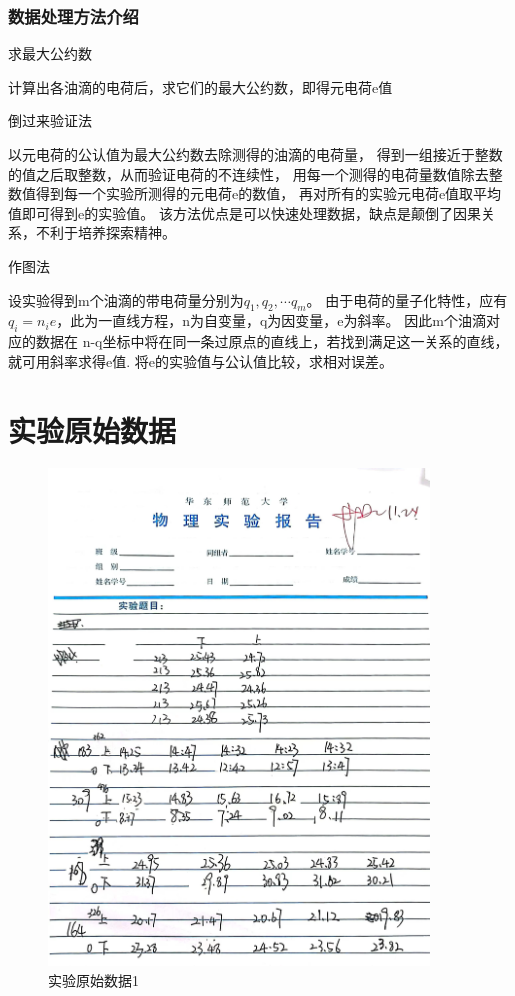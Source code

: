 \documentclass{ctexart}
\begin{document}
    \subsubsection{数据处理方法介绍}
    求最大公约数

    计算出各油滴的电荷后，求它们的最大公约数，即得元电荷e值

    倒过来验证法

    以元电荷的公认值为最大公约数去除测得的油滴的电荷量，
    得到一组接近于整数的值之后取整数，从而验证电荷的不连续性，
    用每一个测得的电荷量数值除去整数值得到每一个实验所测得的元电荷e的数值，
    再对所有的实验元电荷e值取平均值即可得到e的实验值。
    该方法优点是可以快速处理数据，缺点是颠倒了因果关系，不利于培养探索精神。

    作图法

    设实验得到m个油滴的带电荷量分别为$q_{1},q_{2},\cdots q_{m}$。
    由于电荷的量子化特性，应有$q_{i} = n_{i} e$，此为一直线方程，n为自变量，q为因变量，e为斜率。
    因此m个油滴对应的数据在 n-q坐标中将在同一条过原点的直线上，若找到满足这一关系的直线，就可用斜率求得e值.
    将e的实验值与公认值比较，求相对误差。

\section{实验原始数据}
\begin{figure}[H]
  \centering
  \includegraphics[width=0.9\textwidth,height=0.8\textheight]{yuanshishujv.jpg}
  \caption{实验原始数据1}
\end{figure}
\newpage
\end{document}
